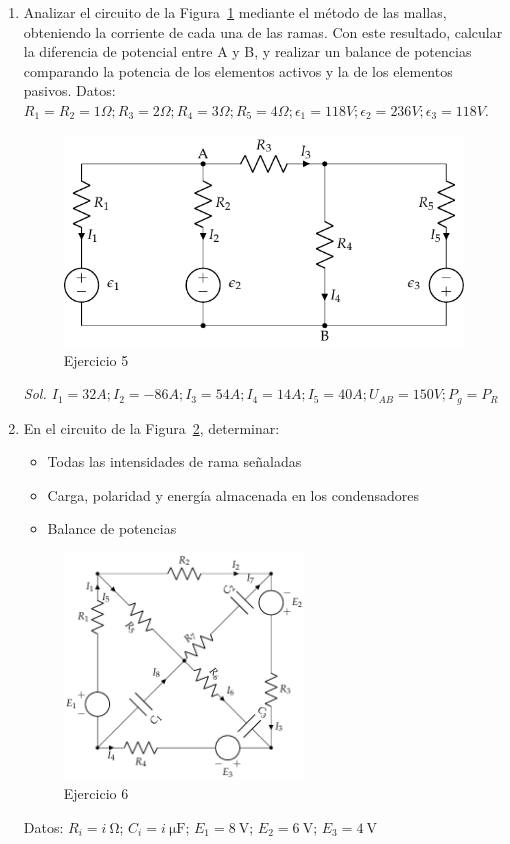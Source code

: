 \begin{enumerate}
\item Analizar el circuito de la Figura~\ref{fig.mallas2} mediante el método de las mallas, obteniendo la corriente de cada una de las ramas. Con este resultado, calcular la diferencia de potencial entre A y B, y realizar un balance de potencias comparando la potencia de los elementos activos y la de los elementos pasivos. Datos: $R_1 = R_2 = {1}\Omega; R_3 = {2}\Omega; R_4 = {3}\Omega; R_5={4}\Omega; \epsilon_1={118} V; \epsilon_2 = 236V; \epsilon_3 = {118}V$.\\
  \begin{figure}[H]
    \centering \includegraphics{../figs/mallas2.pdf}
    \caption{Ejercicio 5}
    \label{fig.mallas2}
  \end{figure}
  \emph{Sol.
    $I_1 = {32}A; I_2 = {-86} A; I_3 ={54}A; I_4 = {14}A; I_5 = {40}A;
    U_{AB}=150V; P_g = P_R$}
 	
\item En el circuito de la Figura~\ref{fig.ej9_BT1}, determinar:
  \begin{itemize}
  \item Todas las intensidades de rama señaladas
  \item Carga, polaridad y energía almacenada en los condensadores
  \item Balance de potencias
  \end{itemize}
  \begin{figure}[H]
    \centering \includegraphics[height=6cm]{../figs/ej9_BT1.pdf}
    \caption{Ejercicio 6}
    \label{fig.ej9_BT1}
  \end{figure}
  Datos: $R_i = \qty[parse-numbers=false]{i}{\ohm}$; $C_i = \qty[parse-numbers=false]{i}{\micro\farad}$; $E_1 = \qty{8}{\volt}$; $E_2 = \qty{6}{\volt}$; $E_3 = \qty{4}{\volt}$


\end{enumerate}
